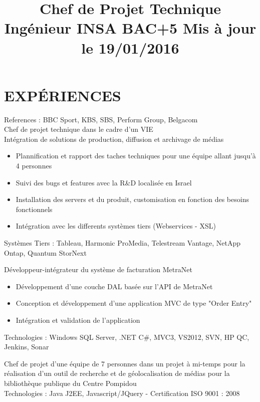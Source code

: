 \documentclass[11pt,a4paper]{moderncv}
\title{Chef de Projet Technique \small{\newline Ingénieur INSA BAC+5} \newline \newline Mis à jour le 19/01/2016} %
\begin{document}
\maketitle




\section{EXPÉRIENCES}
{}{References :  BBC Sport, KBS, SBS, Perform Group, Belgacom 
\\Chef de projet technique dans le cadre d'un VIE 
\\Intégration de solutions de production, diffusion et archivage de médias
\begin{itemize}
\item Plannification et rapport des taches techniques pour une équipe allant jusqu'à 4 personnes
\item Suivi des bugs et features avec la R\&D localisée en Israel
\item Installation des servers et du produit, customisation en fonction des besoins fonctionnels
\item Intégration avec les differents systèmes tiers (Webservices - XSL)
\end{itemize}
Systèmes Tiers : Tableau, Harmonic ProMedia, Telestream Vantage, NetApp Ontap, Quantum StorNext}{}
{}{Développeur-intégrateur du système de facturation MetraNet
\begin{itemize}
\item Développement d'une couche DAL basée sur l'API de MetraNet
\item Conception et développement d'une application MVC de type "Order Entry"
\item Intégration et validation de l'application
\end{itemize}
Technologies : Windows SQL Server, .NET C\#, MVC3, VS2012, SVN, HP QC, Jenkins, Sonar}{}
{}{Chef de projet d’une équipe de 7 personnes dans un projet à mi-temps pour la réalisation d’un outil de recherche et de géolocalisation de médias pour la bibliothèque publique du Centre Pompidou
\\ Technologies : Java J2EE, Javascript/JQuery - Certification ISO 9001 : 2008}{}
\end{document}
